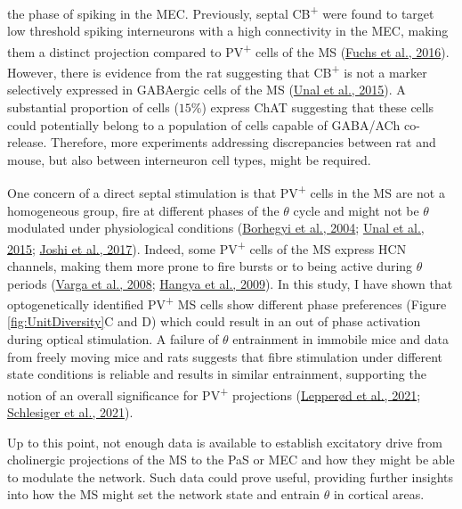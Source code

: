 \documentclass[
  12pt,
  a4paper,
  openany]{book}
\begin{document}
the phase of spiking in the MEC. Previously, septal CB\textsuperscript{+} were found to target low threshold spiking interneurons with a high connectivity in the MEC, making them a distinct projection compared to PV\textsuperscript{+} cells of the MS (\protect\hyperlink{ref-fuchs_local_2016}{Fuchs et al., 2016}). However, there is evidence from the rat suggesting that CB\textsuperscript{+} is not a marker selectively expressed in GABAergic cells of the MS (\protect\hyperlink{ref-unal_synaptic_2015}{Unal et al., 2015}). A substantial proportion of cells (\(15\%\)) express ChAT suggesting that these cells could potentially belong to a population of cells capable of GABA/ACh co-release. Therefore, more experiments addressing discrepancies between rat and mouse, but also between interneuron cell types, might be required.

One concern of a direct septal stimulation is that PV\textsuperscript{+} cells in the MS are not a homogeneous group, fire at different phases of the \(\theta\) cycle and might not be \(\theta\) modulated under physiological conditions (\protect\hyperlink{ref-borhegyi_phase_2004}{Borhegyi et al., 2004}; \protect\hyperlink{ref-unal_synaptic_2015}{Unal et al., 2015}; \protect\hyperlink{ref-joshi_behavior-dependent_2017}{Joshi et al., 2017}). Indeed, some PV\textsuperscript{+} cells of the MS express HCN channels, making them more prone to fire bursts or to being active during \(\theta\) periods (\protect\hyperlink{ref-varga_presence_2008}{Varga et al., 2008}; \protect\hyperlink{ref-hangya_gabaergic_2009}{Hangya et al., 2009}). In this study, I have shown that optogenetically identified PV\textsuperscript{+} MS cells show different phase preferences (Figure \ref{fig:UnitDiversity}C and D) which could result in an out of phase activation during optical stimulation. A failure of \(\theta\) entrainment in immobile mice and data from freely moving mice and rats suggests that fibre stimulation under different state conditions is reliable and results in similar entrainment, supporting the notion of an overall significance for PV\textsuperscript{+} projections (\protect\hyperlink{ref-lepperod_optogenetic_2021}{Lepperød et al., 2021}; \protect\hyperlink{ref-schlesiger_two_2021}{Schlesiger et al., 2021}).

Up to this point, not enough data is available to establish excitatory drive from cholinergic projections of the MS to the PaS or MEC and how they might be able to modulate the network. Such data could prove useful, providing further insights into how the MS might set the network state and entrain \(\theta\) in cortical areas.
\end{document}
